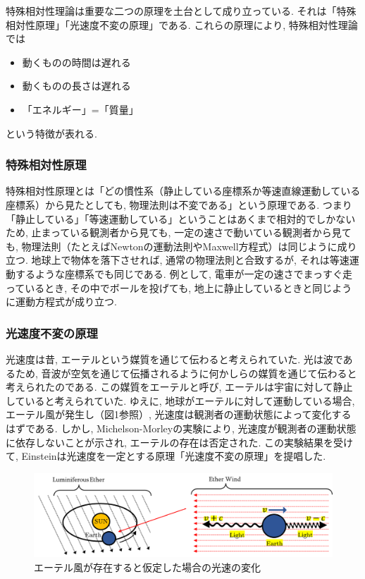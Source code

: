 \documentclass{ltjsarticle}
\begin{document}
特殊相対性理論は重要な二つの原理を土台として成り立っている. 
それは「特殊相対性原理」「光速度不変の原理」である. 
これらの原理により, 特殊相対性理論では
\begin{itemize}
    \item  動くものの時間は遅れる
    \item  動くものの長さは遅れる
    \item 「エネルギー」=「質量」
\end{itemize}
という特徴が表れる. 

\subsubsection{特殊相対性原理}
特殊相対性原理とは「どの慣性系（静止している座標系か等速直線運動している座標系）から見たとしても, 物理法則は不変である」という原理である. 
つまり「静止している」「等速運動している」ということはあくまで相対的でしかないため, 
止まっている観測者から見ても, 一定の速さで動いている観測者から見ても, 物理法則（たとえばNewtonの運動法則やMaxwell方程式）は同じように成り立つ. 
地球上で物体を落下させれば, 通常の物理法則と合致するが, それは等速運動するような座標系でも同じである. 
例として, 電車が一定の速さでまっすぐ走っているとき, その中でボールを投げても, 地上に静止しているときと同じように運動方程式が成り立つ. 

\subsubsection{光速度不変の原理}
光速度は昔, エーテルという媒質を通じて伝わると考えられていた. 
光は波であるため, 音波が空気を通じて伝播されるように何かしらの媒質を通じて伝わると考えられたのである. 
この媒質をエーテルと呼び, エーテルは宇宙に対して静止していると考えられていた. 
ゆえに, 地球がエーテルに対して運動している場合, エーテル風が発生し（図1参照）, 光速度は観測者の運動状態によって変化するはずである.
しかし, Michelson-Morleyの実験により, 光速度が観測者の運動状態に依存しないことが示され, エーテルの存在は否定された. 
この実験結果を受けて, Einsteinは光速度を一定とする原理「光速度不変の原理」を提唱した.

\begin{figure}[htbp]
  \centering
  \includegraphics[width=1\textwidth]{img/エーテル.png}
  \caption{エーテル風が存在すると仮定した場合の光速の変化}
\end{figure}
\end{document}
